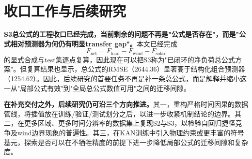 \section{收口工作与后续研究}

\textbf{S3总公式的工程收口已经完成，当前剩余的问题不再是"公式是否存在"，而是"公式相对预测器为何仍有明显transfer gap"。}本文已经完成
\begin{equation}
F_{\text{net}} = F_{\text{load}} - F_{\text{wind}} - F_{\text{solar}}
\end{equation}
的显式合成与test集逐点复算，因此现在可以把S3称为"已闭环的净负荷总公式方案"。但复算结果也显示，总公式的RMSE（2644.36）显著高于结构化组合预测器（1254.62）。因此，后续研究的首要任务不再是补一条总公式，而是解释并缩小这一从"局部公式有效"到"全局总公式数值可用"之间的迁移间隙。

\textbf{在补充交付之外，后续研究仍可沿三个方向推进。}其一，重构严格时间因果的数据管线，将插值放在训练/验证/测试划分之后，以进一步收紧机制结论的边界。其二，在更多区域、更多时间分辨率的数据集上复现S2与S3，以检验自回归捷径竞争及wind边界现象的普遍性。其三，在KAN训练中引入物理约束或更丰富的符号基元，探索是否可以在不牺牲精度的前提下进一步降低局部公式的迁移间隙和复杂度。
